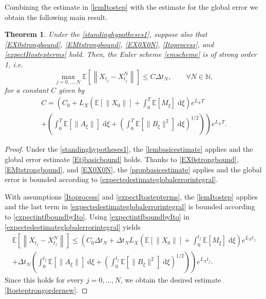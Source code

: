 \documentclass[reqno,12pt]{amsart}
\theoremstyle{plain} %
\newtheorem{theorem}{Theorem}[section]
\theoremstyle{definition} %
\begin{document}
Combining the estimate in \cref{lemItostep} with the estimate for the global error we obtain the following main result.
\begin{theorem}
    \label{thmItostep}
    Under the \cref{standinghypotheses1}, suppose also that
    \eqref{EX0strongbound}, \eqref{EMtstrongbound}, \eqref{EX0X0N}, \eqref{Itoprocess}, and \eqref{expectItostepterms} hold. Then, the Euler scheme \eqref{emscheme} is of strong order 1, i.e.
    \begin{equation}
      \label{Itosteptrongordernew}
        \max_{j=0, \ldots, N}\mathbb{E}\left[ \left\| X_{t_j} - X_{t_j}^N \right\| \right] \leq C \Delta t_N, \qquad \forall N \in \mathbb{N},
    \end{equation}
    for a constant $C$ given by
    \begin{multline}
        \label{constItostepboundstrongordernew}
        C = \left( C_0 +  L_X \left(\mathbb{E}[\|X_0\|] + \int_0^T \mathbb{E}[M_\xi]\;\mathrm{d}\xi\right)e^{L_X T}\right. \\
        \left. + \left(\int_0^T \mathbb{E}[\|A_\xi\|] \;\mathrm{d}\xi + \left(\int_0^T \mathbb{E}[\|B_\xi\|^2] \;\mathrm{d}\xi \right)^{1/2}\right)\right) e^{L_X T}.
    \end{multline}
\end{theorem}

\begin{proof}
    Under the \cref{standinghypotheses1}, the \cref{lembasicestimate} applies and the global error estimate \eqref{Etjbasicbound} holds. Thanks to \eqref{EX0strongbound}, \eqref{EMtstrongbound}, and \eqref{EX0X0N}, the \cref{propbasicestimate} applies and the global error is bounded according to \eqref{expectedestimateglobalerrorintegral}.
    
    With assumptions \eqref{Itoprocess} and \eqref{expectItostepterms}, the \cref{lemItostep} applies and the last term in \eqref{expectedestimateglobalerrorintegral} is bounded according to \eqref{expectintfboundbyIto}. Using \eqref{expectintfboundbyIto} in \eqref{expectedestimateglobalerrorintegral} yields
    \begin{multline*}
        \mathbb{E} \left[\left\|X_{t_j} - X_{t_j}^N\right\|\right] \leq \left( C_0 \Delta t_N + \Delta t_N L_X \left(\mathbb{E}[\|X_0\|] + \int_0^{t_j} \mathbb{E}[M_\xi]\;\mathrm{d}\xi\right)e^{L_X t_j}\right. \\
        \left. + \Delta t_N \left(\int_0^{t_j} \mathbb{E}[\|A_\xi\|] \;\mathrm{d}\xi + \left(\int_0^{t_j} \mathbb{E}[\|B_\xi\|^2] \;\mathrm{d}\xi \right)^{1/2}\right)\right) e^{L_X t_j}.
    \end{multline*}
    Since this holds for every $j=0, \ldots, N$, we obtain the desired estimate \eqref{Itosteptrongordernew}.
\end{proof}
\end{document}

